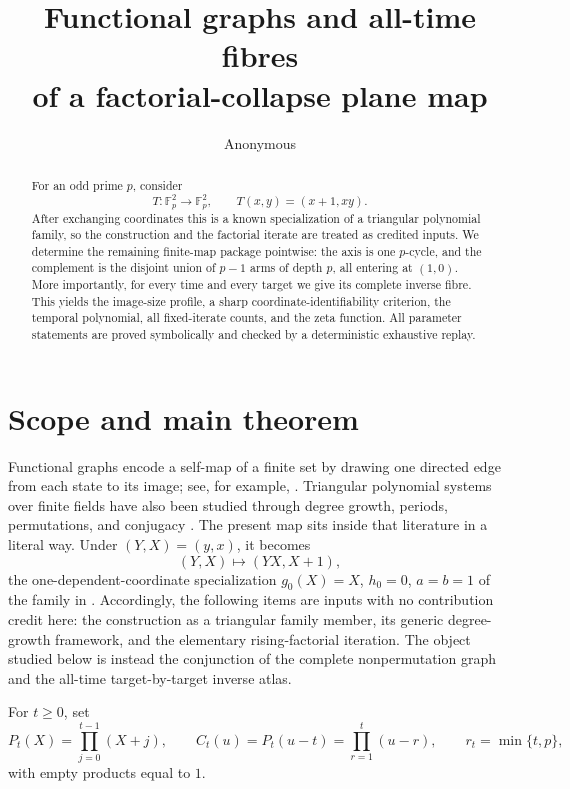 \documentclass[10pt,a4paper]{amsart}
\title[Factorial-collapse plane dynamics]{Functional graphs and all-time fibres\\
of a factorial-collapse plane map}
\author{Anonymous}
\date{}
\theoremstyle{remark}
\newcommand{\F}{\mathbb F}
\begin{document}
\begin{abstract}
For an odd prime \(p\), consider
\[
T\colon\F_p^2\longrightarrow\F_p^2,\qquad T(x,y)=(x+1,xy).
\]
After exchanging coordinates this is a known specialization of a triangular
polynomial family, so the construction and the factorial iterate are treated
as credited inputs.  We determine the remaining finite-map package
pointwise: the axis is one \(p\)-cycle, and the complement is the disjoint
union of \(p-1\) arms of depth \(p\), all entering at \((1,0)\).  More
importantly, for every time and every target we give its complete inverse
fibre.  This yields the image-size profile, a sharp coordinate-identifiability
criterion, the temporal polynomial, all fixed-iterate counts, and the zeta
function.  All parameter statements are proved symbolically and checked by a
deterministic exhaustive replay.
\end{abstract}

\maketitle

\section{Scope and main theorem}

Functional graphs encode a self-map of a finite set by drawing one directed
edge from each state to its image; see, for example,
\citet{KonyaginEtAl2016}.  Triangular polynomial systems over finite fields
have also been studied through degree growth, periods, permutations, and
conjugacy \citep{OstafeShparlinski2010,Ostafe2012,Maubach2011}.
The present map sits inside that literature in a literal way.  Under
\((Y,X)=(y,x)\), it becomes
\[
 (Y,X)\longmapsto(YX,X+1),
\]
the one-dependent-coordinate specialization \(g_0(X)=X\), \(h_0=0\),
\(a=b=1\) of the family in \citet{OstafeShparlinski2010}.  Accordingly, the
following items are inputs with no contribution credit here: the construction
as a triangular family member, its generic degree-growth framework, and the
elementary rising-factorial iteration.  The object studied below is instead
the conjunction of the complete nonpermutation graph and the all-time
target-by-target inverse atlas.

For \(t\geq0\), set
\[
 P_t(X)=\prod_{j=0}^{t-1}(X+j),\qquad
 C_t(u)=P_t(u-t)=\prod_{r=1}^{t}(u-r),
 \qquad r_t=\min\{t,p\},
\]
with empty products equal to \(1\).
\end{document}
